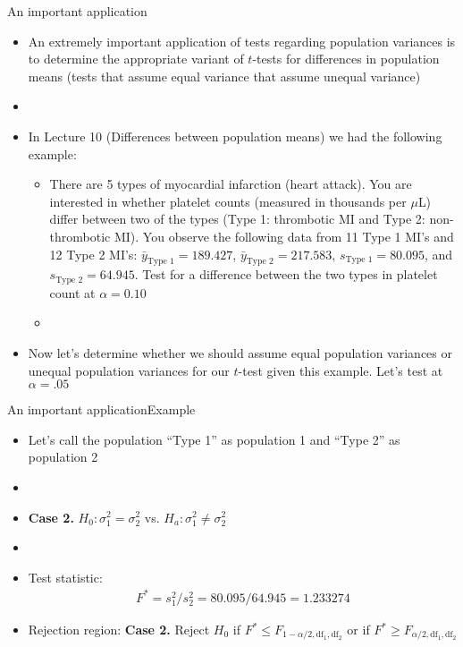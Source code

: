 \documentclass[xcolor=dvipsnames]{beamer}
\begin{document}
\begin{frame}{An important application}
	\begin{itemize}
		\item An extremely important application of tests regarding population variances is to determine the appropriate variant of $t$-tests for differences in population means (tests that assume equal variance that assume unequal variance)
		\item[]
		\item In Lecture 10 (Differences between population means) we had the following example: 
		\begin{itemize}
			\item {\tiny There are 5 types of myocardial infarction (heart attack). You are interested in whether platelet counts (measured in thousands per $\mu$L) differ between two of the types (Type 1: thrombotic MI and Type 2: non-thrombotic MI). You observe the following data from 11 Type 1 MI's and 12 Type 2 MI's: $\bar{y}_{\text{Type 1}}=189.427$, $\bar{y}_{\text{Type 2}}=217.583$, $s_{\text{Type 1}} = 80.095$, and $s_{\text{Type 2}} = 64.945$. Test for a difference between the two types in platelet count at $\alpha = 0.10$}
			\item[]
		\end{itemize}
	\item Now let's determine whether we should assume equal population variances or unequal population variances for our $t$-test given this example. Let's test at $\alpha = .05$
	\end{itemize}
\end{frame}

\begin{frame}{An important application}{Example}
	\begin{itemize}
		\item Let's call the population ``Type 1'' as population 1 and ``Type 2'' as population 2
		\item[]
		\item \textbf{Case 2.} $H_0: \sigma_1^2 = \sigma_2^2$ vs. $H_a: \sigma_1^2 \neq \sigma_2^2$
		\item[]
		\item Test statistic:
		\begin{gather*}
		F^* = s_1^2 /s_2^2 =  80.095 / 64.945 = 1.233274
		\end{gather*}
		\item Rejection region: \textbf{Case 2.} Reject $H_0$ if $F^* \leq F_{1-\alpha / 2, \text{df}_1,\text{df}_2}$ or if $F^* \geq F_{\alpha / 2, \text{df}_1,\text{df}_2} $
	\end{itemize}
\end{frame}
\end{document}
